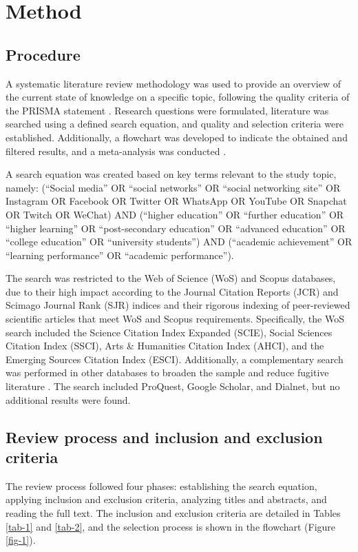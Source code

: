 \documentclass[english]{textolivre}
\begin{document}
\section{Method}

\subsection{Procedure}
A systematic literature review methodology was used to provide an overview of the current state of knowledge on a specific topic, following the quality criteria of the PRISMA statement \cite{page2021}. Research questions were formulated, literature was searched using a defined search equation, and quality and selection criteria were established. Additionally, a flowchart was developed to indicate the obtained and filtered results, and a meta-analysis was conducted \cite{tawfik2019}.

A search equation was created based on key terms relevant to the study topic, namely: (``Social media'' OR ``social networks'' OR ``social networking site'' OR Instagram OR Facebook OR Twitter OR WhatsApp OR YouTube OR Snapchat OR Twitch OR WeChat) AND (``higher education'' OR ``further education'' OR ``higher learning'' OR ``post-secondary education'' OR ``advanced education'' OR ``college education'' OR ``university students'') AND (``academic achievement'' OR ``learning performance'' OR ``academic performance'').

The search was restricted to the Web of Science (WoS) and Scopus databases, due to their high impact according to the Journal Citation Reports (JCR) and Scimago Journal Rank (SJR) indices and their rigorous indexing of peer-reviewed scientific articles that meet WoS and Scopus requirements. Specifically, the WoS search included the Science Citation Index Expanded (SCIE), Social Sciences Citation Index (SSCI), Arts \& Humanities Citation Index (AHCI), and the Emerging Sources Citation Index (ESCI). Additionally, a complementary search was performed in other databases to broaden the sample and reduce fugitive literature \cite{pedrazanavarro2022}. The search included ProQuest, Google Scholar, and Dialnet, but no additional results were found.

\subsection{Review process and inclusion and exclusion criteria}
The review process followed four phases: establishing the search equation, applying inclusion and exclusion criteria, analyzing titles and abstracts, and reading the full text. The inclusion and exclusion criteria are detailed in Tables \ref{tab-1} and \ref{tab-2}, and the selection process is shown in the flowchart (Figure \ref{fig-1}).
\end{document}
